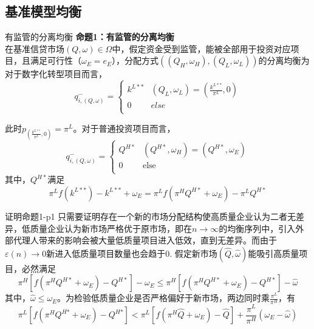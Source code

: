 \documentclass{beamer}
\begin{document}
\subsection{基准模型均衡}

\begin{frame}{有监管的分离均衡}
	\textbf{命题1：有监管的分离均衡}\\
	在基准信贷市场$\left(Q,\omega\right)\in\Omega$中，假定资金受到监管，能被全部用于投资对应项目，且满足可行性（$\omega_E=e_E$），分配方式$\left(\left(Q_H,\omega_H\right),\left(Q_L,\omega_L\right)\right)$的分离均衡为\\
	对于数字化转型项目而言，
	$$ q_{i,\left( Q,\omega  \right)}^{-}=\left\{\begin{matrix}
		{{k}^{L**}} & \left( {{Q}_{L}},{{\omega }_{L}} \right)=\left( \frac{{{k}^{L**}}}{{{\pi }^{L}}},0 \right)  \\
		0 &  else \\
	\end{matrix}\right. $$

	此时$ {{p}_{\left( \frac{{{k}^{L**}}}{{{\pi }^{L}}},0 \right)}}={{\pi }^{L}} $。对于普通投资项目而言，
	$$ q_{i,\left( Q,\omega  \right)}^{-}=\left\{\begin{matrix}
	{{Q}^{H*}} & \left( {{Q}^{H*}},{{\omega }_{H}} \right)=\left( {{Q}^{H*}},{{\omega }_{E}} \right)  \\
	0 &  \text{else}  \\
	\end{matrix}\right.$$
	其中，$ {Q}^{H*} $满足
	$${{\pi }^{L}}f\left( {{k}^{L**}} \right)-{{k}^{L**}}+{{\omega }_{E}}={{\pi }^{L}}f\left( {{\pi }^{H}}{{Q}^{H*}}+{{\omega }_{E}} \right)-{{\pi }^{L}}{{Q}^{H*}}$$
\end{frame}

\begin{frame}{证明命题1-p1}
	只需要证明存在一个新的市场分配结构使高质量企业认为二者无差异，低质量企业认为新市场严格优于原市场，即在$n\to\infty$的均衡序列中，引入外部代理人带来的影响会被大量低质量项目进入低效，直到无差异。而由于$\varepsilon\left(n\right)\to0$新进入低质量项目数量也会趋于0.
	假定新市场$\left(\hat{Q},\hat{\omega}\right)$能吸引高质量项目，必然满足
	$${{\pi }^{H}}\left[ f\left( {{\pi }^{H}}{{Q}^{H*}}+{{\omega }_{E}} \right)-{{Q}^{H*}} \right]-{{\omega }_{E}}\leq{{\pi }^{H}}\left[ f\left( {{\pi }^{H}}{{Q}^{H*}}+{{\omega }_{E}} \right)-{{Q}^{H*}} \right]-\hat{\omega }$$
	其中，$\hat{\omega}\leq\omega_E$。为检验低质量企业是否严格偏好于新市场，两边同时乘$\frac{\pi^L}{\pi^H}$，有
	$${{\pi }^{L}}\left[ f\left( {{\pi }^{H}}{{Q}^{H\text{*}}}+{{\omega }_{E}} \right)-{{Q}^{H\text{*}}} \right]<{{\pi }^{L}}\left[ f\left( {{\pi }^{H}}\hat{Q}+{{\omega }_{E}} \right)-\hat{Q} \right]+\frac{{{\pi }^{L}}}{{{\pi }^{H}}}\left( {{\omega }_{E}}-\hat{\omega } \right)$$\\
\end{frame}
\end{document}
